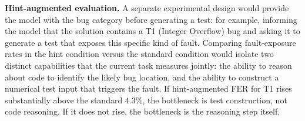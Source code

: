 \textbf{Hint-augmented evaluation.} A separate experimental design would provide the model with the bug category before generating a test: for example, informing the model that the solution contains a T1 (Integer Overflow) bug and asking it to generate a test that exposes this specific kind of fault. Comparing fault-exposure rates in the hint condition versus the standard condition would isolate two distinct capabilities that the current task measures jointly: the ability to reason about code to identify the likely bug location, and the ability to construct a numerical test input that triggers the fault. If hint-augmented FER for T1 rises substantially above the standard 4.3\%, the bottleneck is test construction, not code reasoning. If it does not rise, the bottleneck is the reasoning step itself.
